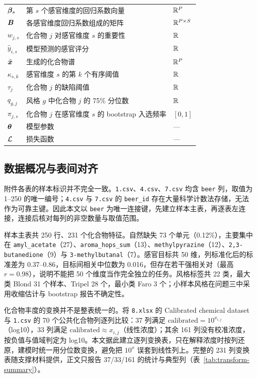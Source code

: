 \begin{longtable}{@{}p{} p{} p{}@{}}
  $\bm{\beta}_s$ & 第 $s$ 个感官维度的回归系数向量 & $\mathbb{R}^{P}$ \\
  $\bm{B}$ & 各感官维度回归系数组成的矩阵 & $\mathbb{R}^{P\times S}$ \\
  $w_{j,s}$ & 化合物 $j$ 对感官维度 $s$ 的重要性 & $\mathbb{R}$ \\
  $\hat{y}_{i,s}$ & 模型预测的感官评分 & $\mathbb{R}$ \\
  $\tilde{\bm{x}}$ & 生成的化合物谱 & $\mathbb{R}^{P}$ \\
  $\kappa_{s,k}$ & 感官维度 $s$ 的第 $k$ 个有序阈值 & $\mathbb{R}$ \\
  $\tau_j$ & 化合物 $j$ 的缺陷阈值 & $\mathbb{R}$ \\
  $q_{g,j}$ & 风格 $g$ 中化合物 $j$ 的 75\% 分位数 & $\mathbb{R}$ \\
  $\pi_{j,s}$ & 化合物 $j$ 在感官维度 $s$ 的 bootstrap 入选频率 & $[0,1]$ \\
  $\bm{\theta}$ & 模型参数 & — \\
  $\mathcal{L}$ & 损失函数 & — \\
  \bottomrule
\end{longtable}
\label{tab:notation}

\subsection{数据概况与表间对齐}

附件各表的样本标识并不完全一致。\texttt{1.csv}、\texttt{4.csv}、\texttt{7.csv} 均含 \texttt{beer} 列，取值为 1--250 的唯一编号；\texttt{4.csv} 与 \texttt{7.csv} 的 \texttt{beer\_id} 存在大量科学计数法存储，无法作为可靠主键。因此本文以 \texttt{beer} 为唯一连接键，先建立样本主表，再逐表左连接，连接后核对每列的非空数量与取值范围。

样本主表共 250 行、231 个化合物特征。自然缺失 73 个单元（0.12\%），主要集中在 \texttt{amyl\_acetate}（27）、\texttt{aroma\_hops\_sum}（13）、\texttt{methylpyrazine}（12）、\texttt{2,3-butanedione}（9）与 \texttt{3-methylbutanal}（7）。感官目标共 50 维，列标准化后的标准差为 0.37--0.86，目标间相关中位数为 0.016，但存在若干强相关对（最高 $r=0.98$），说明不能把 50 个维度当作完全独立的任务。风格标签共 22 类，最大类 Blond 31 个样本、Tripel 28 个，最小类 Faro 3 个；小样本风格在问题三中采用收缩估计与 bootstrap 报告不确定性。

化合物丰度的变换并不是整表统一的。将 \texttt{8.xlsx} 的 Calibrated chemical dataset 与 \texttt{1.csv} 的 70 个公共化合物列逐列比较：37 列满足 $\text{calibrated}=10^{x_{i,j}}$（log10），33 列满足 $\text{calibrated}\approx x_{i,j}$（线性浓度）；其余 161 列没有校准浓度，按负值与值域判定为 log10。本文据此建立逐列变换表，只在解释浓度时按列还原，建模时统一用分位数变换，避免把 $10^{x}$ 误套到线性列上。完整的 231 列变换表随支撑材料提供，正文只报告 37/33/161 的统计与典型列（表~\ref{tab:transform-summary}）。

